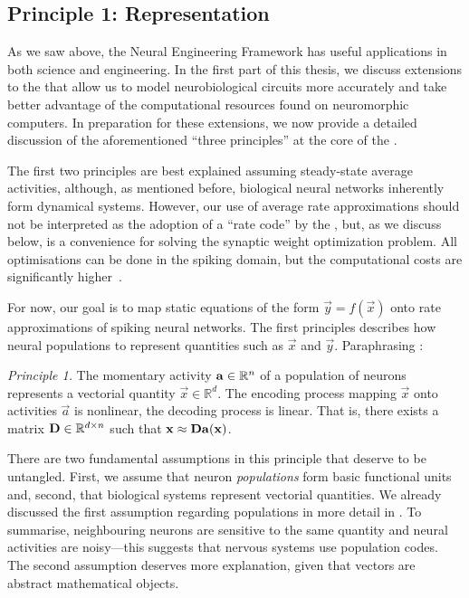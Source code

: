 \pagebreak

\subsection{Principle 1: Representation}

\label{sec:nef_representation}

As we saw above, the Neural Engineering Framework has useful applications in both science and engineering.
In the first part of this thesis, we discuss extensions to the \NEF that allow us to model neurobiological circuits more accurately and take better advantage of the computational resources found on neuromorphic computers.
In preparation for these extensions, we now provide a detailed discussion of the aforementioned \enquote{three principles} at the core of the \NEF.

The first two \NEF principles are best explained assuming steady-state average activities, although, as mentioned before, biological neural networks inherently form dynamical systems.
However, our use of average rate approximations should not be interpreted as the adoption of a \enquote{rate code} by the \NEF, but, as we discuss below, is a convenience for solving the synaptic weight optimization problem.
All optimisations can be done in the spiking domain, but the computational costs are significantly higher~\citep{macneil2011finetuning}.

For now, our goal is to map static equations of the form $\vec y = f(\vec x)$ onto rate approximations of spiking neural networks.
The first \NEF principles describes how neural populations to represent quantities such as $\vec x$ and $\vec y$.
Paraphrasing \citet{eliasmith2003neural}:
\begin{framed}
\noindent\emph{\NEF Principle 1.}
The momentary activity $\mathbf{a} \in \mathbb{R}^{n}$ of a population of \Npop neurons represents a vectorial quantity $\vec x \in \mathbb{R}^d$. The encoding process mapping $\vec x$ onto activities $\vec a$ is nonlinear,	the decoding process is linear.
That is, there exists a matrix $\mathbf{D} \in \mathbb{R}^{d \times n}$ such that $\mathbf{x} \approx \mathbf{\mathbf{D}} \mathbf{a}(\mathbf{x})$.
\end{framed}
There are two fundamental assumptions in this principle that deserve to be untangled.
First, we assume that neuron \emph{populations} form basic functional units and, second, that biological systems represent vectorial quantities.
We already discussed the first assumption regarding populations in more detail in .
To summarise, neighbouring neurons are sensitive to the same quantity and neural activities are noisy---this suggests that nervous systems use population codes.
The second assumption deserves more explanation, given that vectors are abstract mathematical objects.

